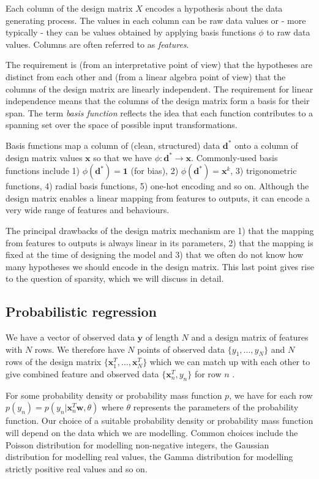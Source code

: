 \documentclass[11pt]{article}
\begin{document}
	Each column of the design matrix $X$ encodes a hypothesis about the data generating process. The values in each column can be raw data values or - more typically - they can be values obtained by applying basis functions $\phi$ to raw data values. Columns are often referred to as \emph{features}.
	
	The requirement is (from an interpretative point of view) that the hypotheses are distinct from each other and (from a linear algebra point of view) that the columns of the design matrix are linearly independent. The requirement for linear independence means that the columns of the design matrix form a basis for their span. The term \emph{basis function} reflects the idea that each function contributes to a spanning set over the space of possible input transformations.
	
	Basis functions map a column of (clean, structured) data $\boldsymbol{d}^{*}$ onto a column of design matrix values $\boldsymbol{x}$ so that we have $\phi:\boldsymbol{d}^{*} \rightarrow \boldsymbol{x}$. Commonly-used basis functions include 1) $\phi(\boldsymbol{d}^{*}) = \boldsymbol{1}$ (for bias), 2) $\phi(\boldsymbol{d}^{*}) = \boldsymbol{x} ^ {k}$, 3) trigonometric functions, 4) radial basis functions, 5) one-hot encoding and so on. Although the design matrix enables a linear mapping from features to outputs, it can encode a very wide range of features and behaviours.
	
	The principal drawbacks of the design matrix mechanism are 1) that the mapping from features to outputs is always linear in its parameters, 2) that the mapping is fixed at the time of designing the model and 3) that we often do not know how many hypotheses we should encode in the design matrix. This last point gives rise to the question of sparsity, which we will discuss in detail.
	
	\subsection{Probabilistic regression}
	
	We have a vector of observed data $\boldsymbol{y}$ of length $N$ and a design matrix of features with $N$ rows. We therefore have $N$ points of observed data $\{y_{1}, \dots, y_{N}\}$ and $N$ rows of the design matrix $\{\boldsymbol{x}^{T}_{1}, \dots, \boldsymbol{x}^{T}_{N}\}$ which we can match up with each other to give combined feature and observed data $\{\boldsymbol{x}^{T}_{n}, y_{n}\}$ for row $n$ .
	
	For some probability density or probability mass function $p$, we have for each row $p(y_{n}) = p(y_{n}|\boldsymbol{x}^{T}_{n}\boldsymbol{w}, \theta)$ where $\theta$ represents the parameters of the probability function. Our choice of a suitable probability density or probability mass function will depend on the data which we are modelling. Common choices include the Poisson distribution for modelling non-negative integers, the Gaussian distribution for modelling real values, the Gamma distribution for modelling strictly positive real values and so on.
	
\end{document}
